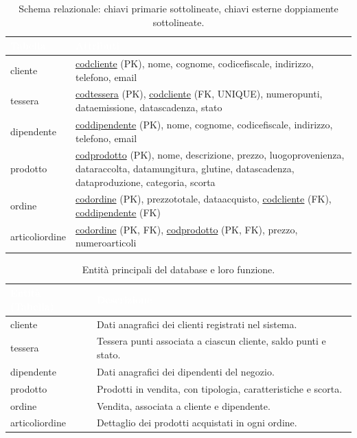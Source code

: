 \documentclass[a4paper,12pt]{article}
\begin{document}
\vspace{0.5em}
\renewcommand{\arraystretch}{1.35}
\begin{table}[ht]
\centering
\setlength{\tabcolsep}{8pt}
\begin{tabular}{|>{\centering\arraybackslash}m{3.5cm}|>{\raggedright\arraybackslash}m{10.5cm}|}
\hline
\rowcolor{myblue}\textcolor{white}{\textbf{Tabella}} & \textcolor{white}{\textbf{Attributi}} \\
\hline
\rowcolor{mygray} cliente & \underline{codcliente} (PK), nome, cognome, codicefiscale, indirizzo, telefono, email \\
tessera & \underline{codtessera} (PK), \underline{\underline{codcliente}} (FK, UNIQUE), numeropunti, dataemissione, datascadenza, stato \\
\rowcolor{mygray} dipendente & \underline{coddipendente} (PK), nome, cognome, codicefiscale, indirizzo, telefono, email \\
prodotto & \underline{codprodotto} (PK), nome, descrizione, prezzo, luogoprovenienza, dataraccolta, datamungitura, glutine, datascadenza, dataproduzione, categoria, scorta \\
\rowcolor{mygray} ordine & \underline{codordine} (PK), prezzototale, dataacquisto, \underline{\underline{codcliente}} (FK), \underline{\underline{coddipendente}} (FK) \\
articoliordine & \underline{codordine} (PK, FK), \underline{codprodotto} (PK, FK), prezzo, numeroarticoli \\
\hline
\end{tabular}
\caption{Schema relazionale: chiavi primarie sottolineate, chiavi esterne doppiamente sottolineate.}
\end{table}

\vspace{1.5em}
\renewcommand{\arraystretch}{1.3}
\begin{table}[htbp]
\centering
\setlength{\tabcolsep}{8pt}
\begin{tabular}{|>{\centering\arraybackslash}m{3.5cm}|>{\raggedright\arraybackslash}m{9.5cm}|}
\hline
\rowcolor{myblue}\textcolor{white}{\textbf{Entità (Tabella)}} & \textcolor{white}{\textbf{Descrizione}} \\
\hline
\rowcolor{mygray} cliente & Dati anagrafici dei clienti registrati nel sistema. \\
tessera & Tessera punti associata a ciascun cliente, saldo punti e stato. \\
\rowcolor{mygray} dipendente & Dati anagrafici dei dipendenti del negozio. \\
prodotto & Prodotti in vendita, con tipologia, caratteristiche e scorta. \\
\rowcolor{mygray} ordine & Vendita, associata a cliente e dipendente. \\
articoliordine & Dettaglio dei prodotti acquistati in ogni ordine. \\
\hline
\end{tabular}
\caption{Entità principali del database e loro funzione.}
\end{table}
\end{document}
